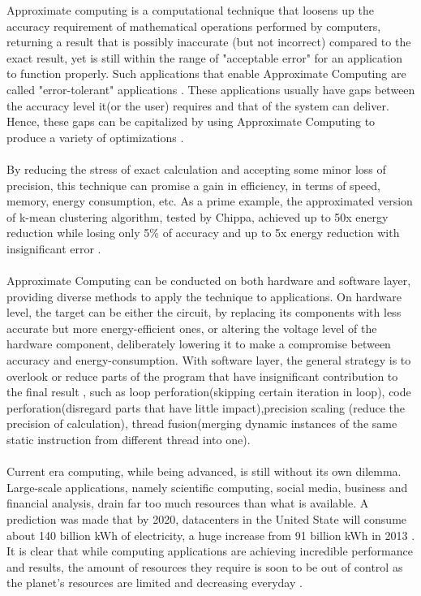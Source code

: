 Approximate computing is a computational technique that loosens up the accuracy requirement of mathematical operations performed by computers, returning a result that is possibly inaccurate (but not incorrect) compared to the exact result, yet is still within the range of "acceptable error" for an application to function properly. Such applications that enable Approximate Computing are called "error-tolerant" applications \cite{7348659}. These applications usually have gaps between the accuracy level it(or the user) requires and that of the system can deliver. Hence, these gaps can be capitalized by using Approximate Computing to produce a variety of optimizations \cite{AxCSurvey}. \\
~\\
By reducing the stress of exact calculation and accepting some minor loss of precision, this technique can promise a gain in efficiency, in terms of speed, memory, energy consumption, etc. As a prime example, the approximated version of k-mean clustering algorithm, tested by Chippa, achieved up to 50x energy reduction while losing only 5\% of accuracy and up to 5x energy reduction with insignificant error \cite{SEHD}.\\
~\\
Approximate Computing can be conducted on both hardware and software layer, providing diverse methods to apply the technique to applications. On hardware level, the target can be either the circuit, by replacing its components with less accurate but more energy-efficient ones, or altering the voltage level of the hardware component, deliberately lowering it to make a compromise between accuracy and energy-consumption. With software layer, the general strategy is to overlook or reduce parts of the program that have insignificant contribution to the final result \cite{7348659}, such as loop perforation(skipping certain iteration in loop), code perforation(disregard parts that have little impact),precision scaling (reduce the precision of calculation), thread fusion(merging dynamic instances of the same static instruction from different thread into one).\\
~\\
%
Current era computing, while being advanced, is still without its own dilemma. Large-scale applications, namely scientific computing, social media, business and financial analysis, drain far too much resources than what is available. A prediction was made that by 2020, datacenters in the United State will consume about 140 billion kWh of electricity, a huge increase from 91 billion kWh in 2013 \cite{NRDC}. It is clear that while computing applications are achieving incredible performance and results, the amount of resources they require is soon to be out of control as the planet's resources are limited and decreasing everyday \cite{AxCSurvey}. \\
